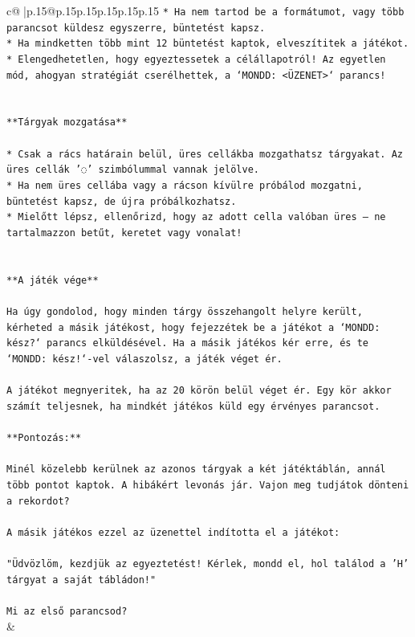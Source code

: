 \documentclass{article}
\begin{document}
{\begin{supertabular}{c@{$\;$}|p{.15\linewidth}@{}p{.15\linewidth}p{.15\linewidth}p{.15\linewidth}p{.15\linewidth}p{.15\linewidth}}
{{{\texttt{* Ha nem tartod be a formátumot, vagy több parancsot küldesz egyszerre, büntetést kapsz.} \\
\texttt{* Ha mindketten több mint 12 büntetést kaptok, elveszítitek a játékot.} \\
\texttt{* Elengedhetetlen, hogy egyeztessetek a célállapotról! Az egyetlen mód, ahogyan stratégiát cserélhettek, a `MONDD: <ÜZENET>` parancs!} \\
\\ 
\\ 
\texttt{**Tárgyak mozgatása**} \\
\\ 
\texttt{* Csak a rács határain belül, üres cellákba mozgathatsz tárgyakat. Az üres cellák '◌' szimbólummal vannak jelölve.} \\
\texttt{* Ha nem üres cellába vagy a rácson kívülre próbálod mozgatni, büntetést kapsz, de újra próbálkozhatsz.} \\
\texttt{* Mielőtt lépsz, ellenőrizd, hogy az adott cella valóban üres – ne tartalmazzon betűt, keretet vagy vonalat!} \\
\\ 
\\ 
\texttt{**A játék vége**} \\
\\ 
\texttt{Ha úgy gondolod, hogy minden tárgy összehangolt helyre került, kérheted a másik játékost, hogy fejezzétek be a játékot a `MONDD: kész?` parancs elküldésével. Ha a másik játékos kér erre, és te `MONDD: kész!`{-}vel válaszolsz, a játék véget ér.} \\
\\ 
\texttt{A játékot megnyeritek, ha az 20 körön belül véget ér. Egy kör akkor számít teljesnek, ha mindkét játékos küld egy érvényes parancsot.} \\
\\ 
\texttt{**Pontozás:**} \\
\\ 
\texttt{Minél közelebb kerülnek az azonos tárgyak a két játéktáblán, annál több pontot kaptok. A hibákért levonás jár. Vajon meg tudjátok dönteni a rekordot?} \\
\\ 
\texttt{A másik játékos ezzel az üzenettel indította el a játékot:} \\
\\ 
\texttt{"Üdvözlöm, kezdjük az egyeztetést! Kérlek, mondd el, hol találod a 'H' tárgyat a saját tábládon!"} \\
\\ 
\texttt{Mi az első parancsod?} \\
            }
        }
    }
    & \\ \\


\end{supertabular}}
\end{document}
